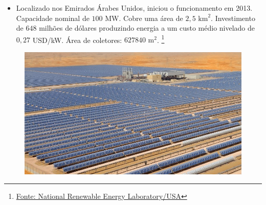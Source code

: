 \documentclass[12pt,notheorems,hyperref={pdfauthor=Professor Rafael Nardi}]{beamer}
\begin{document}
\begin{frame}%

	\begin{itemize} 
		\item Localizado nos Emirados Árabes Unidos, iniciou o funcionamento em
			2013. Capacidade nominal de $100$ MW. Cobre uma área de $2,5$
			$\text{km}^2$. Investimento de $648$ milhões de dólares produzindo
			energia a um custo médio nivelado de $0,27$ USD/kW. Área de coletores:
			$627840$ $\text{m}^2$.  \footnote{\href{portal petronoticias.com.br}{Fonte: National Renewable Energy Laboratory/USA}}
	\end{itemize}

	\bigskip

	\begin{figure}[ht]
		\centering
		\includegraphics[scale=0.35]{./Shams_1.jpg}
	\end{figure}

\end{frame}
\end{document}
